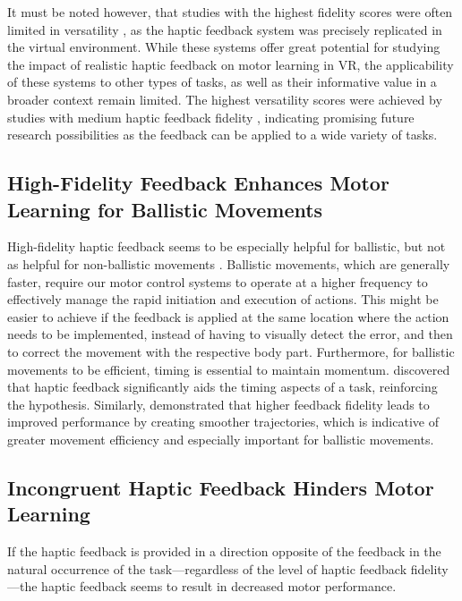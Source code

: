 It must be noted however, that studies with the highest fidelity scores were often limited in versatility \cite{Huang2007, LeeH2014, Vaghela2021}, as the haptic feedback system was precisely replicated in the virtual environment. While these systems offer great potential for studying the impact of realistic haptic feedback on motor learning in VR, the applicability of these systems to other types of tasks, as well as their informative value in a broader context remain limited.
The highest versatility scores were achieved by studies with medium haptic feedback fidelity \cite{Yang2023, McAnally2023}, indicating promising future research possibilities as the feedback can be applied to a wide variety of tasks.

\subsection{High-Fidelity Feedback Enhances Motor Learning for Ballistic Movements}

High-fidelity haptic feedback seems to be especially helpful for ballistic, but not as helpful for non-ballistic movements \cite{Wall2000}. Ballistic movements, which are generally faster, require our motor control systems to operate at a higher frequency to effectively manage the rapid initiation and execution of actions. This might be easier to achieve if the feedback is applied at the same location where the action needs to be implemented, instead of having to visually detect the error, and then to correct the movement with the respective body part. Furthermore, for ballistic movements to be efficient, timing is essential to maintain momentum. \cite{Feygin2002HapticSkill} discovered that haptic feedback significantly aids the timing aspects of a task, reinforcing the hypothesis. Similarly, \cite{Chi2017} demonstrated that higher feedback fidelity leads to improved performance by creating smoother trajectories, which is indicative of greater movement efficiency and especially important for ballistic movements.


\subsection{Incongruent Haptic Feedback Hinders Motor Learning}
If the haptic feedback is provided in a direction opposite of the feedback in the natural occurrence of the task---regardless of the level of haptic feedback fidelity---the haptic feedback seems to result in decreased motor performance. 

